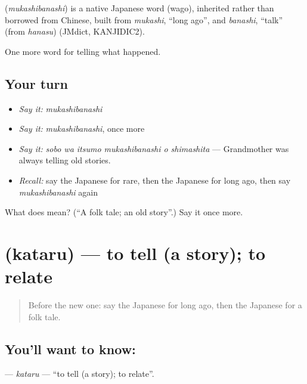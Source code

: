 \begin{cousinweb}
\textbf{} (\emph{mukashibanashi}) is a native Japanese word (wago), inherited rather than borrowed from Chinese, built from \emph{mukashi}, \textquotedblleft{}long ago\textquotedblright{}, and \emph{banashi}, \textquotedblleft{}talk\textquotedblright{} (from \emph{hanasu}) (JMdict, KANJIDIC2).
\end{cousinweb}

\begin{grammarlens}[title={What you've built}]
One more word for telling what happened.
\end{grammarlens}

\subsection*{Your turn}
\begin{itemize}
\raggedright
  \item \emph{Say it:} \emph{mukashibanashi}
  \item \emph{Say it:} \emph{mukashibanashi}, once more
  \item \emph{Say it:} \emph{sobo wa itsumo mukashibanashi o shimashita} — Grandmother was always telling old stories.
  \item \emph{Recall:} say the Japanese for rare, then the Japanese for long ago, then say \emph{mukashibanashi} again
\end{itemize}

\begin{tcolorbox}[breakable,colback=teal!4,colframe=teal!35!black,title={Before you move on}]
What does  mean? (\textquotedblleft{}A folk tale; an old story\textquotedblright{}.) Say it once more.
\end{tcolorbox}
\section[\texorpdfstring{\ja{かたる} (kataru)}{かたる (kataru)}]{ (kataru) — to tell (a story); to relate}

\label{lesson:JA-C298-kataru}



\begin{quote}
Before the new one: say the Japanese for long ago, then the Japanese for a folk tale.
\end{quote}

\subsection*{You'll want to know: }
\textbf{} — \emph{kataru} — \textquotedblleft{}to tell (a story); to relate\textquotedblright{}.

